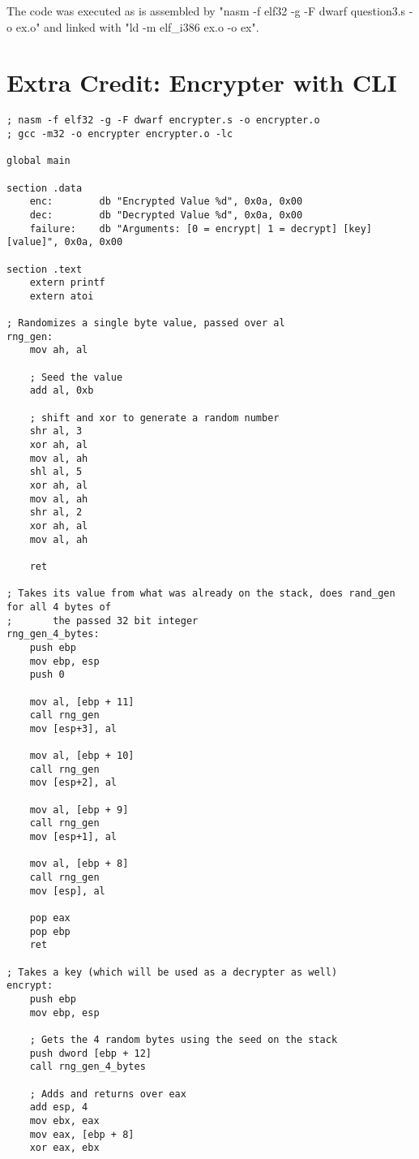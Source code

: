 \documentclass[11pt]{article}
\begin{document}
The code was executed as is assembled by "nasm -f elf32 -g -F dwarf question3.s -o ex.o" and linked with "ld -m elf\_i386 ex.o -o ex".

\pagebreak

\section*{Extra Credit: Encrypter with CLI}
\begin{lstlisting}
; nasm -f elf32 -g -F dwarf encrypter.s -o encrypter.o
; gcc -m32 -o encrypter encrypter.o -lc

global main

section .data
    enc:        db "Encrypted Value %d", 0x0a, 0x00 
    dec:        db "Decrypted Value %d", 0x0a, 0x00 
    failure:    db "Arguments: [0 = encrypt| 1 = decrypt] [key] [value]", 0x0a, 0x00 

section .text
    extern printf
    extern atoi

; Randomizes a single byte value, passed over al
rng_gen:
    mov ah, al

    ; Seed the value
    add al, 0xb

    ; shift and xor to generate a random number
    shr al, 3
    xor ah, al
    mov al, ah
    shl al, 5
    xor ah, al
    mov al, ah
    shr al, 2
    xor ah, al
    mov al, ah

    ret

; Takes its value from what was already on the stack, does rand_gen for all 4 bytes of 
;       the passed 32 bit integer
rng_gen_4_bytes:
    push ebp 
    mov ebp, esp
    push 0

    mov al, [ebp + 11]
    call rng_gen
    mov [esp+3], al

    mov al, [ebp + 10]
    call rng_gen
    mov [esp+2], al

    mov al, [ebp + 9]
    call rng_gen
    mov [esp+1], al

    mov al, [ebp + 8]
    call rng_gen
    mov [esp], al

    pop eax
    pop ebp
    ret
    
; Takes a key (which will be used as a decrypter as well)
encrypt:
    push ebp
    mov ebp, esp

    ; Gets the 4 random bytes using the seed on the stack
    push dword [ebp + 12]
    call rng_gen_4_bytes

    ; Adds and returns over eax
    add esp, 4
    mov ebx, eax
    mov eax, [ebp + 8]
    xor eax, ebx 


\end{lstlisting}
\end{document}
